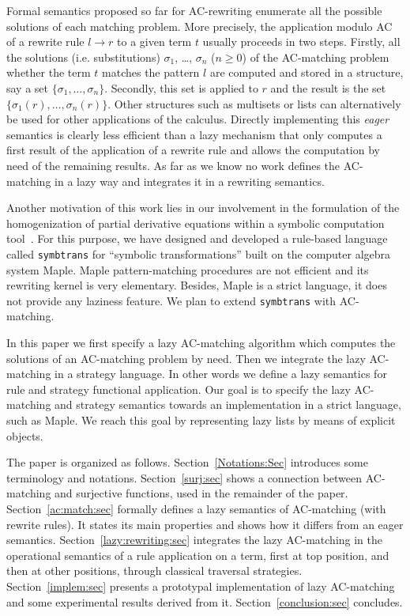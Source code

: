 \documentclass[submission,copyright,creativecommons]{eptcs}
\newcommand \rrule[2]{#1\rightarrow #2}
\newcommand \set[1]{\{#1\}}
\numberwithin{subcase}{case}
\begin{document}
Formal semantics proposed so far for AC-rewriting enumerate all the possible
solutions of each matching problem. More precisely, the application modulo AC of
a rewrite rule $\rrule{l}{r}$ to a given term $t$ usually proceeds in two steps.
Firstly, all the solutions (i.e. substitutions) $\sigma_1$, \ldots, $\sigma_n$
($n \ge 0$) of the AC-matching problem whether the term $t$ matches the pattern
$l$ are computed and stored in a structure, say a set
$\set{\sigma_1,\ldots,\sigma_n}$. Secondly, this set is applied to $r$ and the
result is the set $\set{\sigma_1(r),\ldots, \sigma_n(r)}$. Other structures such
as multisets or lists can alternatively be used for other applications of the
calculus. Directly implementing this \emph{eager} semantics is clearly less
efficient than a lazy mechanism that only computes a first result of the
application of a rewrite rule and allows the computation by need of the remaining
results.  As far
as we know no work defines the AC-matching in a lazy way and integrates it in a
rewriting semantics.


Another motivation of this work lies in our involvement in the formulation of
the homogenization of partial derivative equations within a
 symbolic computation tool~\cite{EuroSim11,CFM11}.
For this purpose, we have designed and developed a rule-based language
 called \texttt{symbtrans} \cite{BGL-JSC10} for ``symbolic transformations''
 built on the computer algebra system Maple. Maple  pattern-matching procedures
 are not efficient and its rewriting kernel is very elementary. Besides, Maple
 is a strict language, it does not provide any laziness feature.
We plan to extend \texttt{symbtrans} with AC-matching.
 

In this paper we first specify a lazy AC-matching algorithm which computes
 the solutions of an AC-matching problem by need.
 Then we integrate the lazy AC-matching in a strategy
language. In other words we define a lazy semantics for rule and strategy
functional application. Our goal is to specify the lazy AC-matching and strategy
 semantics towards an implementation in a strict language, such as
Maple. We reach this goal by  representing  lazy lists by means of explicit
objects.
 


The paper is organized as follows. Section~\ref{Notations:Sec} introduces some
terminology and notations. Section~\ref{surj:sec} shows a connection between
AC-matching and surjective functions, used in the remainder of the paper.
Section~\ref{ac:match:sec} formally defines  a lazy semantics of AC-matching
(with rewrite rules). It states its main properties and shows how it differs
from an eager semantics.
Section~\ref{lazy:rewriting:sec} integrates the lazy AC-matching in the
operational semantics of a rule application on a term, first at top position,
and then at other positions, through classical traversal strategies.
Section~\ref{implem:sec} presents a prototypal implementation of lazy
AC-matching and some experimental results derived from it.
Section~\ref{conclusion:sec} concludes.
\end{document}
